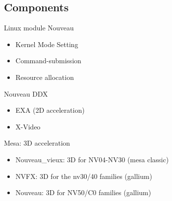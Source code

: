 \documentclass[11pt,english,compress]{beamer}
\begin{document}
	\subsection{Components}
		\begin{frame}
			\begin{block}{Linux module Nouveau}
				\begin{itemize}
					\item Kernel Mode Setting
					\item Command-submission
					\item Resource allocation
				\end{itemize}
			\end{block}

			\begin{block}{Nouveau DDX}
				\begin{itemize}
					\item EXA (2D acceleration) 
					\item X-Video
				\end{itemize}
			\end{block}

			\begin{block}{Mesa: 3D acceleration}
				\begin{itemize}
					\item Nouveau\_vieux: 3D for NV04-NV30 (mesa classic)
					\item NVFX: 3D for the nv30/40 families (gallium)
					\item Nouveau: 3D for NV50/C0 families (gallium)
				\end{itemize}
			\end{block}
		\end{frame}
\end{document}
